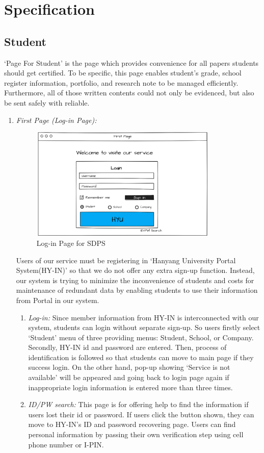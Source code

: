 \documentclass[conference]{IEEEtran}
\begin{document}
\section{Specification}
\subsection{Student} 
‘Page For Student’ is the page which provides convenience for all papers students should get certified. To be specific, this page enables student’s grade, school register information, portfolio, and research note to be managed efficiently. Furthermore, all of those written contents could not only be evidenced, but also be sent safely with reliable.\\
\begin{enumerate}
	\item \textit {First Page (Log-in Page): }
	\begin{figure}[htbp]
	\centerline{\includegraphics[width=89mm,scale=0.5]{student/login.png}}
	\caption{Log-in Page for SDPS}
	\label{fig}
	\end{figure}
	
	Users of our service must be registering in ‘Hanyang University Portal System(HY-IN)’ so that we do not offer any extra sign-up function. Instead, our system is trying to minimize the inconvenience of students and costs for maintenance of redundant data by enabling students to use their information from Portal in our system.\\
	
    \begin{enumerate}
    	\item \textit{Log-in: }Since member information from HY-IN is interconnected with our system, students can login without separate sign-up. So users firstly select ‘Student’ menu of three providing menus: Student, School, or Company. Secondly, HY-IN id and password are entered. Then, process of identification is followed so that students can move to main page if they success login. On the other hand, pop-up showing ‘Service is not available’ will be appeared and going back to login page again if inappropriate login information is entered more than three times.\\
        \item \textit{ID/PW search: }This page is for offering help to find the information if users lost their id or password. If users click the button shown, they can move to HY-IN’s ID and password recovering page. Users can find personal information by passing their own verification step using cell phone number or I-PIN.\\
    \end{enumerate}
    

\end{enumerate}
\end{document}
